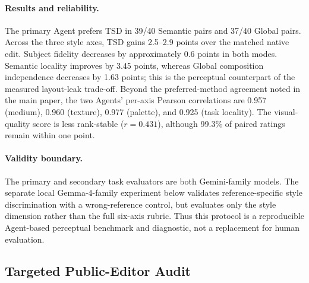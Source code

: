 \documentclass[letterpaper]{article}
\begin{document}
\begingroup
\centering
{}
\label{tab:supp-agent-multidim}
\scriptsize
\setlength{\tabcolsep}{2.1pt}
\resizebox{\columnwidth}{!}{%
%
}
\par
\endgroup

\paragraph{Results and reliability.}
The primary Agent prefers TSD in 39/40 Semantic pairs and 37/40 Global pairs.
Across the three style axes, TSD gains 2.5--2.9 points over the matched native
edit. Subject fidelity decreases by approximately 0.6 points in both modes.
Semantic locality improves by 3.45 points, whereas Global composition
independence decreases by 1.63 points; this is the perceptual counterpart of
the measured layout-leak trade-off. Beyond the preferred-method agreement noted
in the main paper, the two Agents' per-axis Pearson correlations are 0.957
(medium), 0.960 (texture), 0.977 (palette), and 0.925 (task locality). The
visual-quality score is less rank-stable ($r=0.431$), although 99.3\% of paired
ratings remain within one point.

\paragraph{Validity boundary.}
The primary and secondary task evaluators are both Gemini-family models. The
separate local Gemma-4-family experiment below validates reference-specific
style discrimination with a wrong-reference control, but evaluates only the
style dimension rather than the full six-axis rubric. Thus this protocol is a
reproducible Agent-based perceptual benchmark and diagnostic, not a replacement
for human evaluation.

\subsection{Targeted Public-Editor Audit}
\end{document}
